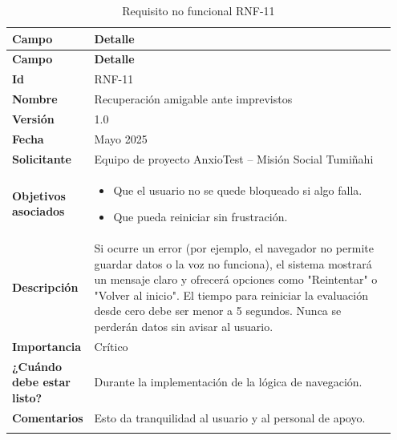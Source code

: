 \begin{longtable}{p{0.15\linewidth} p{0.80\linewidth}}
\toprule
\rowcolor{tableheader!20}
\textbf{Campo} & \textbf{Detalle} \\
\midrule
\endfirsthead
\rowcolor{tableheader!20}
\textbf{Campo} & \textbf{Detalle} \\
\midrule
\endhead
\bottomrule
\endfoot
\textbf{Id} & RNF-11 \\
\textbf{Nombre} & Recuperación amigable ante imprevistos \\
\textbf{Versión} & 1.0 \\
\textbf{Fecha} & Mayo 2025 \\
\textbf{Solicitante} & Equipo de proyecto AnxioTest – Misión Social Tumiñahi \\
\textbf{Objetivos asociados} & 
  \begin{itemize}
    \item Que el usuario no se quede bloqueado si algo falla.
    \item Que pueda reiniciar sin frustración.
  \end{itemize} \\
\textbf{Descripción} & Si ocurre un error (por ejemplo, el navegador no permite guardar datos o la voz no funciona), el sistema mostrará un mensaje claro y ofrecerá opciones como "Reintentar" o "Volver al inicio". El tiempo para reiniciar la evaluación desde cero debe ser menor a 5 segundos. Nunca se perderán datos sin avisar al usuario. \\
\textbf{Importancia} & Crítico \\
\textbf{¿Cuándo debe estar listo?} & Durante la implementación de la lógica de navegación. \\
\textbf{Comentarios} & Esto da tranquilidad al usuario y al personal de apoyo. \\
\bottomrule
\caption{Requisito no funcional RNF-11}
\end{longtable}